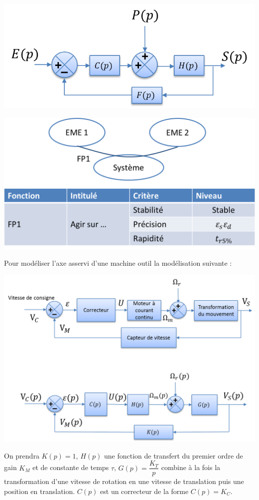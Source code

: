 \documentclass[10pt,oneside]{article}
\begin{document}
\begin{minipage}[c]{.48\linewidth}
\begin{center}
\includegraphics[width=.95\textwidth]{png/bloc1}
\end{center}
\end{minipage}\hfill
\begin{minipage}[c]{.48\linewidth}
\begin{center}
\includegraphics[width=.95\textwidth]{png/cdc}
\end{center}
\end{minipage}

\begin{exemple}
Pour modéliser l'axe asservi d'une machine outil la modélisation suivante :
\begin{center}
\includegraphics[width=.6\textwidth]{png/bloc2}
\end{center}
On prendra $K(p)=1$, $H(p)$ une fonction de transfert du premier ordre de gain $K_M$ et de constante de temps $\tau$, $G(p)=\dfrac{K_T}{p}$ combine à la fois la transformation d'une vitesse de rotation en une vitesse de translation puis une position en translation. $C(p)$ est un correcteur de la forme $C(p)=K_C$.
\end{exemple}
\end{document}

